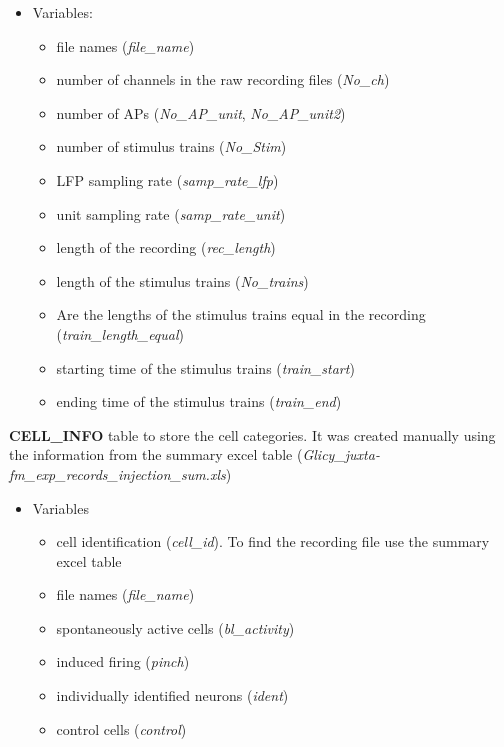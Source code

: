 \documentclass[12pt,]{article}
\providecommand{\tightlist}{%
  \setlength{\itemsep}{0pt}\setlength{\parskip}{0pt}}
\begin{document}
\begin{itemize}
\tightlist
\item
  Variables:

  \begin{itemize}
  \tightlist
  \item
    file names (\emph{file\_name})
  \item
    number of channels in the raw recording files (\emph{No\_ch})
  \item
    number of APs (\emph{No\_AP\_unit}, \emph{No\_AP\_unit2})
  \item
    number of stimulus trains (\emph{No\_Stim})
  \item
    LFP sampling rate (\emph{samp\_rate\_lfp})
  \item
    unit sampling rate (\emph{samp\_rate\_unit})
  \item
    length of the recording (\emph{rec\_length})
  \item
    length of the stimulus trains (\emph{No\_trains})
  \item
    Are the lengths of the stimulus trains equal in the recording
    (\emph{train\_length\_equal})
  \item
    starting time of the stimulus trains (\emph{train\_start})
  \item
    ending time of the stimulus trains (\emph{train\_end})
  \end{itemize}
\end{itemize}

\hypertarget{htmlwidget-2ddff7c553eeec48f2fd}{}

\hypertarget{htmlwidget-f6dd8818fcbbec2f7ff0}{}

\textbf{CELL\_INFO} table to store the cell categories. It was created
manually using the information from the summary excel table
(\emph{Glicy\_juxta-fm\_exp\_records\_injection\_sum.xls})

\begin{itemize}
\tightlist
\item
  Variables

  \begin{itemize}
  \tightlist
  \item
    cell identification (\emph{cell\_id}). To find the recording file
    use the summary excel table
  \item
    file names (\emph{file\_name})
  \item
    spontaneously active cells (\emph{bl\_activity})
  \item
    induced firing (\emph{pinch})
  \item
    individually identified neurons (\emph{ident})
  \item
    control cells (\emph{control})
  \end{itemize}
\end{itemize}
\end{document}
